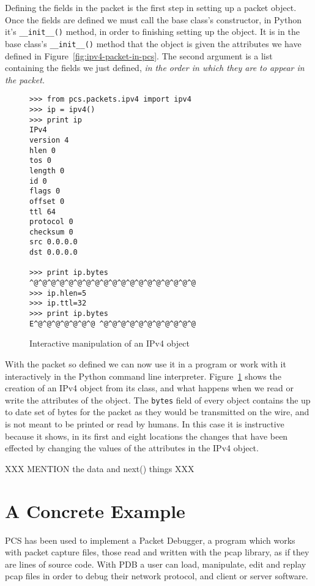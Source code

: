 \documentclass{sig-alternate-10pt}
\begin{document}
Defining the fields in the packet is the first step in setting up a
packet object.  Once the fields are defined we must call the base
class's constructor, in Python it's \verb|__init__()| method, in order
to finishing setting up the object.  It is in the base class's
\verb|__init__()| method that the object is given the attributes we
have defined in Figure~\ref{fig:ipv4-packet-in-pcs}.  The second
argument is a list containing the fields we just defined, \emph{in the order
in which they are to appear in the packet.}  

\begin{figure}
  \centering
\begin{verbatim}
>>> from pcs.packets.ipv4 import ipv4
>>> ip = ipv4()
>>> print ip
IPv4
version 4
hlen 0
tos 0
length 0
id 0
flags 0
offset 0
ttl 64
protocol 0
checksum 0
src 0.0.0.0
dst 0.0.0.0

>>> print ip.bytes
^@^@^@^@^@^@^@^@^@^@^@^@^@^@^@^@^@^@^@
>>> ip.hlen=5
>>> ip.ttl=32
>>> print ip.bytes
E^@^@^@^@^@^@^@ ^@^@^@^@^@^@^@^@^@^@^@
\end{verbatim}
  \caption{Interactive manipulation of an IPv4 object}
  \label{fig:interactive-manipulation-of-an-ipv4-object}
\end{figure}

With the packet so defined we can now use it in a program or work with
it interactively in the Python command line interpreter.
Figure~\ref{fig:interactive-manipulation-of-an-ipv4-object} shows the
creation of an IPv4 object from its class, and what happens when we
read or write the attributes of the object.  The \verb|bytes| field of
every  object contains the up to date set of bytes for
the packet as they would be transmitted on the wire, and is not meant
to be printed or read by humans.  In this case it is instructive
because it shows, in its first and eight locations the changes that
have been effected by changing the values of the attributes in the
IPv4 object.

XXX MENTION the data and next() things XXX

\section{A Concrete Example}
\label{sec:a-concrete-example}

PCS has been used to implement a Packet Debugger, a program which
works with packet capture files, those read and written with the pcap
library, as if they are lines of source code.  With PDB a user can
load, manipulate, edit and replay pcap files in order to debug their
network protocol, and client or server software.
\end{document}
